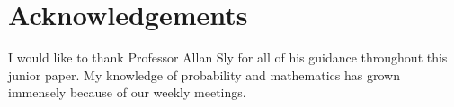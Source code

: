 \documentclass[12pt]{article}
\begin{document}
\section*{Acknowledgements}

I would like to thank Professor Allan Sly for all of his guidance throughout this junior paper. My knowledge of probability and mathematics has grown immensely because of our weekly meetings. 

\cleardoublepage
{}
{}


\end{document}
